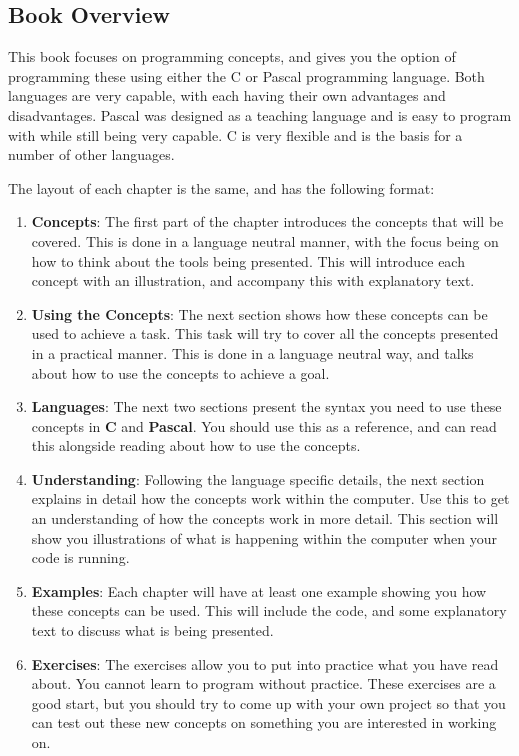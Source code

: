 \clearpage
\subsection{Book Overview} %
\label{sub:book_overview}

This book focuses on programming concepts, and gives you the option of programming these using either the C or Pascal programming language. Both languages are very capable, with each having their own advantages and disadvantages. Pascal was designed as a teaching language and is easy to program with while still being very capable. C is very flexible and is the basis for a number of other languages.

The layout of each chapter is the same, and has the following format:
\begin{enumerate}
  \item \textbf{Concepts}: The first part of the chapter introduces the concepts that will be covered. This is done in a language neutral manner, with the focus being on how to think about the tools being presented. This will introduce each concept with an illustration, and accompany this with explanatory text.
  \item \textbf{Using the Concepts}: The next section shows how these concepts can be used to achieve a task. This task will try to cover all the concepts presented in a practical manner. This is done in a language neutral way, and talks about how to use the concepts to achieve a goal.
  \item \textbf{Languages}: The next two sections present the syntax you need to use these concepts in \textbf{C} and \textbf{Pascal}. You should use this as a reference, and can read this alongside reading about how to use the concepts.
  \item \textbf{Understanding}: Following the language specific details, the next section explains in detail how the concepts work within the computer. Use this to get an understanding of how the concepts work in more detail. This section will show you illustrations of what is happening within the computer when your code is running.
  \item \textbf{Examples}: Each chapter will have at least one example showing you how these concepts can be used. This will include the code, and some explanatory text to discuss what is being presented.
  \item \textbf{Exercises}: The exercises allow you to put into practice what you have read about. You cannot learn to program without practice. These exercises are a good start, but you should try to come up with your own project so that you can test out these new concepts on something you are interested in working on.
\end{enumerate}



